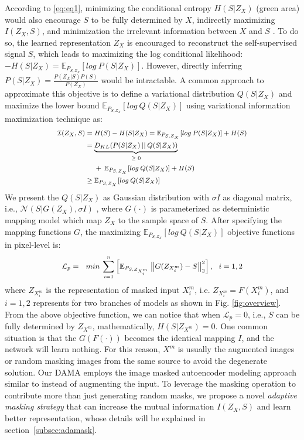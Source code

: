\documentclass[10pt,twocolumn,letterpaper]{article}
\begin{document}
According to \eqref{eq:eq1}, minimizing the conditional entropy $H(S|Z_X)$ (green area) would also encourage $S$ to be fully determined by $X$, indirectly maximizing $I(Z_X,S)$, and minimization the irrelevant information between $X$ and $S$ \cite{twins,morency}. To do so, the learned representation $Z_X$ is encouraged to reconstruct the self-supervised signal $S$, which leads to maximizing the log conditional likelihood: $-H(S|Z_X) = \mathbb{E}_{P_{S,Z_X}}[log\:P(S|Z_X)]$. However, directly inferring $P(S|Z_X)=\frac{P(Z_X|S)P(S)}{P(Z_X)}$ would be intractable. A common approach to approximate this objective is to define a variational distribution $Q(S|Z_X)$ and maximize the lower bound $\mathbb{E}_{P_{S,Z_X}}[log\:Q(S|Z_X)]$ using variational information maximization technique \cite{varim} as:
\begin{equation}\label{eq:eq2}
\footnotesize
\begin{aligned}
\mathcal I(Z_X,S) &= H(S) - H(S|Z_X) = \mathbb{E}_{P_{S,Z_X}}[log\:P(S|Z_X)] + H(S) \\
                 &= \underbrace{D_{KL}(P(S|Z_X)\:||\:Q(S|Z_X))}_\text{$\geq 0$} \\
                 &\:\:\:\:\:\:+\: \mathbb{E}_{P_{S,Z_X}}[log\:Q(S|Z_X)] + H(S) \\
                 &\geq \mathbb{E}_{P_{S,Z_X}}[log\:Q(S|Z_X)]
\end{aligned}
\end{equation}
We present the $Q(S|Z_X)$ as Gaussian distribution with $\sigma I$ as diagonal matrix, i.e., $\mathcal N(S|G(Z_X),\sigma I)$ \cite{gan,morency,completer}, where $G(\cdot)$ is parameterized as deterministic mapping model which map $Z_X$ to the sample space of $S$. After specifying the mapping functions $G$, the maximizing $\mathbb{E}_{P_{S,Z_X}}[log\:Q(S|Z_{X})]$ objective functions in pixel-level is:
\begin{equation}\label{eq:eq3}
\small
\begin{aligned}
\mathcal L_{p} = 
 \:\:\:min\:\sum_{i=1}^{n}\left[\mathbb{E}_{P_{S,Z_{X_i^m}}}\left \| G(Z_{X_i^m}) - S \right \|_{2}^{2}\right], \:\:\: i=1,2
\end{aligned}
\end{equation}
where $Z_{X_i^m}$ is the representation of masked input $X_i^m$, i.e. $Z_{X_i^m}=F(X_i^m)$, and $i=1,2$ represents for two branches of models as shown in Fig. \ref{fig:overview}. From the above objective function, we can notice that when $\mathcal L_{p}=0$, i.e., $S$ can be fully determined by $Z_{X^m}$, mathematically, $H(S|Z_{X^m}) = 0$. One common situation is that the $G(F(\cdot))$ becomes the identical mapping $I$, and the network will learn nothing. For this reason, $X^m$ is usually the augmented images or random masking images from the same source to avoid the degenerate solution. Our DAMA employs the image masked autoencoder modeling approach similar to \cite{mae,beit,simmim,data2vec} instead of augmenting the input. To leverage the masking operation to contribute more than just generating random masks, we propose a novel \textit{adaptive masking strategy} that can increase the mutual information $I(Z_X,S)$ and learn better representation, whose details will be explained in section~\ref{subsec:adamask}.
\end{document}
